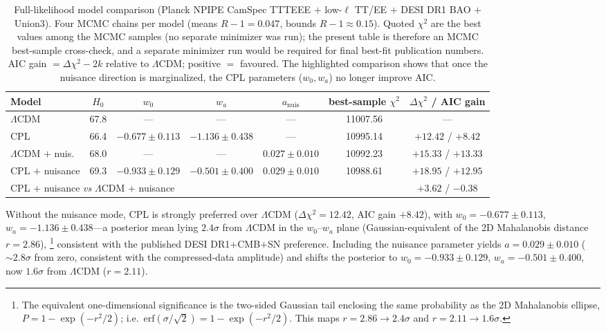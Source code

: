 \documentclass[11pt]{article}
\begin{document}
\begin{table}[h]
\centering
\caption{Full-likelihood model comparison (Planck NPIPE CamSpec TTTEEE $+$ low-$\ell$
TT/EE $+$ DESI DR1 BAO $+$ Union3). Four MCMC chains per model (means $R-1=0.047$,
bounds $R-1\approx0.15$). Quoted $\chi^2$ are the best values among the MCMC samples
(no separate minimizer was run); the present table is therefore an MCMC best-sample
cross-check, and a separate minimizer run would be required for final best-fit
publication numbers. AIC gain $=\Delta\chi^2-2k$ relative to
$\Lambda$CDM; positive $=$ favoured. The highlighted comparison shows that once the
nuisance direction is marginalized, the CPL parameters ($w_0,w_a$) no longer improve AIC.}
\label{tab:fullplanck}
\small\setlength{\tabcolsep}{3pt}
\begin{tabular}{lcccccc}
\toprule
Model & $H_0$ & $w_0$ & $w_a$ & $a_\mathrm{nuis}$ & best-sample $\chi^2$ & $\Delta\chi^2$ / AIC gain \\
\midrule
$\Lambda$CDM            & 67.8 & ---              & ---              & ---                & 11007.56 & --- \\
CPL                     & 66.4 & $-0.677\pm0.113$ & $-1.136\pm0.438$ & ---                & 10995.14 & $+12.42$ / $+8.42$ \\
$\Lambda$CDM $+$ nuis.  & 68.0 & ---              & ---              & $0.027\pm0.010$    & 10992.23 & $+15.33$ / $+13.33$ \\
CPL $+$ nuisance        & 69.3 & $-0.933\pm0.129$ & $-0.501\pm0.400$ & $0.029\pm0.010$    & 10988.61 & $+18.95$ / $+12.95$ \\
\midrule
\multicolumn{6}{l}{CPL $+$ nuisance \emph{vs} $\Lambda$CDM $+$ nuisance}
                        & $+3.62$ / $\mathbf{-0.38}$ \\
\bottomrule
\end{tabular}
\end{table}

Without the nuisance mode, CPL is strongly preferred over $\Lambda$CDM
($\Delta\chi^2=12.42$, AIC gain $+8.42$), with $w_0=-0.677\pm0.113$,
$w_a=-1.136\pm0.438$---a posterior mean lying $2.4\sigma$ from $\Lambda$CDM in the
$w_0$--$w_a$ plane (Gaussian-equivalent of the 2D Mahalanobis distance $r=2.86$),%
\footnote{The equivalent one-dimensional significance is the two-sided Gaussian tail
enclosing the same probability as the 2D Mahalanobis ellipse,
$P=1-\exp(-r^2/2)$; i.e.\ $\mathrm{erf}(\sigma/\sqrt2)=1-\exp(-r^2/2)$. This maps
$r=2.86\to2.4\sigma$ and $r=2.11\to1.6\sigma$.}
consistent with the published DESI DR1$+$CMB$+$SN preference. Including the nuisance
parameter yields $a=0.029\pm0.010$ ($\sim2.8\sigma$ from zero, consistent with the
compressed-data amplitude) and shifts the posterior to $w_0=-0.933\pm0.129$,
$w_a=-0.501\pm0.400$, now $1.6\sigma$ from $\Lambda$CDM ($r=2.11$).
\end{document}
